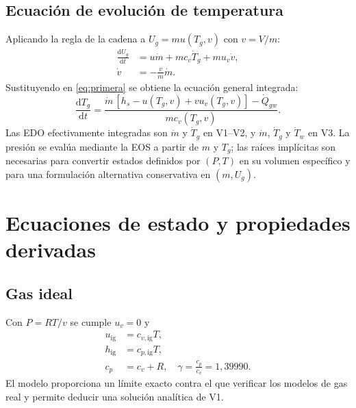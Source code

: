 \documentclass[11pt,letterpaper]{article}
\newcommand{\dd}{\mathrm{d}}
\begin{document}
\subsection{Ecuación de evolución de temperatura}
Aplicando la regla de la cadena a $U_g=mu(T_g,v)$ con $v=V/m$:
\begin{align}
\frac{\dd U_g}{\dd t}&=u\dot m+m c_v\dot T_g+m u_v\dot v,\\
\dot v&=-\frac{v}{m}\dot m.
\end{align}
Sustituyendo en \eqref{eq:primera} se obtiene la ecuación general integrada:
\begin{equation}
\boxed{\frac{\dd T_g}{\dd t}=\frac{\dot m\,[h_s-u(T_g,v)+v u_v(T_g,v)]-\dot Q_{gw}}{m c_v(T_g,v)}.}\label{eq:Tgeneral}
\end{equation}
Las EDO efectivamente integradas son $\dot m$ y $\dot T_g$ en V1--V2, y $\dot m$, $\dot T_g$ y $\dot T_w$ en V3. La presión se evalúa mediante la EOS a partir de $m$ y $T_g$; las raíces implícitas son necesarias para convertir estados definidos por $(P,T)$ en su volumen específico y para una formulación alternativa conservativa en $(m,U_g)$.

\section{Ecuaciones de estado y propiedades derivadas}
\subsection{Gas ideal}
Con $P=RT/v$ se cumple $u_v=0$ y
\begin{equation}\begin{aligned}
u_{\mathrm{ig}}&=c_{v,\mathrm{ig}}T,\\
h_{\mathrm{ig}}&=c_{p,\mathrm{ig}}T,\\
c_p&=c_v+R,\quad\gamma=\frac{c_p}{c_v}=1,39990.
\end{aligned}\label{eq:ideal}\end{equation}
El modelo proporciona un límite exacto contra el que verificar los modelos de gas real y permite deducir una solución analítica de V1.
\end{document}
